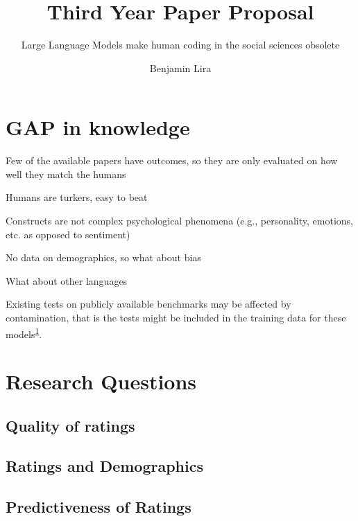 \documentclass[
  10pt,
  letterpaper,
  DIV=11,
  numbers=noendperiod]{scrartcl}
\title{Third Year Paper Proposal}
\subtitle{Large Language Models make human coding in the social sciences
obsolete}
\author{Benjamin Lira}
\date{}
\begin{document}
\maketitle
\ifdefined\Shaded\renewenvironment{Shaded}{\begin{tcolorbox}[frame hidden, borderline west={3pt}{0pt}{shadecolor}, sharp corners, interior hidden, breakable, boxrule=0pt, enhanced]}{\end{tcolorbox}}\fi

\hypertarget{gap-in-knowledge}{%
\section{GAP in knowledge}\label{gap-in-knowledge}}

Few of the available papers have outcomes, so they are only evaluated on
how well they match the humans

Humans are turkers, easy to beat

Constructs are not complex psychological phenomena (e.g., personality,
emotions, etc. as opposed to sentiment)

No data on demographics, so what about bias

What about other languages

Existing tests on publicly available benchmarks may be affected by
contamination, that is the tests might be included in the training data
for these models\textsuperscript{\protect\hyperlink{ref-pangakis}{1}}.

\hypertarget{research-questions}{%
\section{Research Questions}\label{research-questions}}

\hypertarget{quality-of-ratings}{%
\subsection{Quality of ratings}\label{quality-of-ratings}}

\hypertarget{ratings-and-demographics}{%
\subsection{Ratings and Demographics}\label{ratings-and-demographics}}

\hypertarget{predictiveness-of-ratings}{%
\subsection{Predictiveness of Ratings}\label{predictiveness-of-ratings}}
\end{document}
